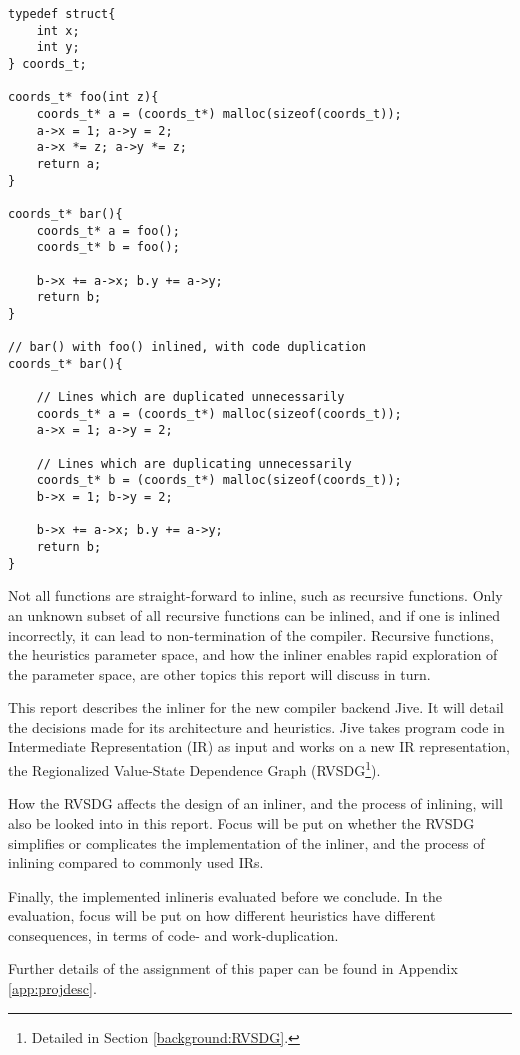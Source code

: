 \begin{lstlisting}[label={lst:code-dup}, style=customcpp,
caption={Code duplication in \textit{bar()}, when inlining \textit{foo()} into
\textit{bar()}.}]
typedef struct{
	int x;
	int y;
} coords_t;

coords_t* foo(int z){
	coords_t* a = (coords_t*) malloc(sizeof(coords_t));
	a->x = 1; a->y = 2;
	a->x *= z; a->y *= z;
	return a;
}

coords_t* bar(){
	coords_t* a = foo();
	coords_t* b = foo();

	b->x += a->x; b.y += a->y;
	return b;
}

// bar() with foo() inlined, with code duplication
coords_t* bar(){

	// Lines which are duplicated unnecessarily
	coords_t* a = (coords_t*) malloc(sizeof(coords_t));
	a->x = 1; a->y = 2;

	// Lines which are duplicating unnecessarily
	coords_t* b = (coords_t*) malloc(sizeof(coords_t));
	b->x = 1; b->y = 2;

	b->x += a->x; b.y += a->y;
	return b;
}
\end{lstlisting}

Not all functions are straight-forward to inline, such as recursive functions.
Only an unknown subset of all recursive functions can be inlined, and if one is
inlined incorrectly, it can lead to non-termination of the compiler. Recursive
functions, the heuristics parameter space, and how the inliner enables rapid
exploration of the parameter space, are other topics this report will discuss in
turn.

This report describes the inliner for the new compiler backend Jive. It will
detail the decisions made for its architecture and heuristics. Jive takes
program code in Intermediate Representation (IR) as input and works on a new IR
representation, the Regionalized Value-State Dependence Graph
(RVSDG\footnote{Detailed in Section \ref{background:RVSDG}.}).


How the RVSDG affects the design of an inliner, and the process of inlining,
will also be looked into in this report. Focus will be put on whether the RVSDG
simplifies or complicates the implementation of the inliner, and the process of
inlining compared to commonly used IRs.

Finally, the implemented inlineris evaluated before we conclude. In the
evaluation, focus will be put on how different heuristics have different
consequences, in terms of code- and work-duplication.

Further details of the assignment of this paper can be found in Appendix
\ref{app:projdesc}.
